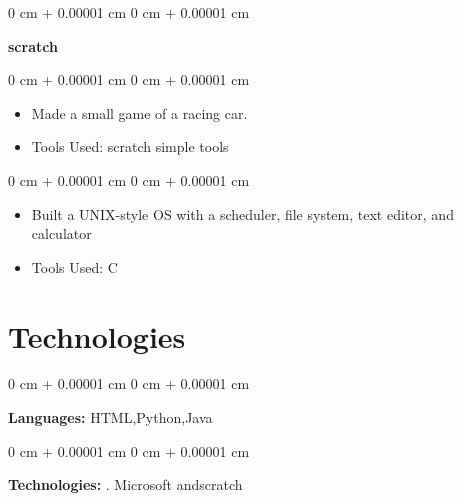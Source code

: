 \documentclass[10pt, letterpaper]{article}
\newenvironment{highlights}{
    \begin{itemize}[
        topsep=0.10 cm,
        parsep=0.10 cm,
        partopsep=0pt,
        itemsep=0pt,
        leftmargin=0 cm + 10pt
    ]
}{
    \end{itemize}
} %
\newenvironment{onecolentry}{
    \begin{adjustwidth}{
        0 cm + 0.00001 cm
    }{
        0 cm + 0.00001 cm
    }
}{
    \end{adjustwidth}
} %
\newenvironment{twocolentry}[2][]{
    \onecolentry
    \def\secondColumn{#2}
    \setcolumnwidth{\fill, 4.5 cm}
    \begin{paracol}{2}
}{
    \switchcolumn \raggedleft \secondColumn
    \end{paracol}
    \endonecolentry
} %
\begin{document}
        
        \begin{twocolentry}{
            
        }
            \textbf{scratch}\end{twocolentry}

        \vspace{0.10 cm}
        \begin{onecolentry}
            \begin{highlights}
                \item Made a small game of a racing car.
                \item Tools Used: scratch simple tools
            \end{highlights}
        \end{onecolentry}


        \vspace{0.2 cm}

       
        \begin{onecolentry}
            \begin{highlights}
                \item Built a UNIX-style OS with a scheduler, file system, text editor, and calculator
                \item Tools Used: C
            \end{highlights}
        \end{onecolentry}



    
    \section{Technologies}



        
        \begin{onecolentry}
            \textbf{Languages:} HTML,Python,Java
        \end{onecolentry}

        \vspace{0.2 cm}

        \begin{onecolentry}
            \textbf{Technologies:} . Microsoft andscratch 
        \end{onecolentry}


    
\end{document}
